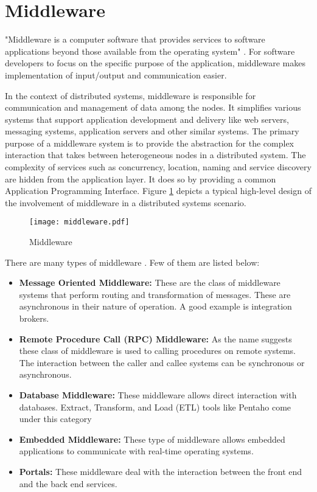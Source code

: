 \section{Middleware}

"Middleware is a computer software that provides services to software applications beyond those available from the operating system" \parencite{middleware_wiki}. For software developers to focus on the specific purpose of the application, middleware makes implementation of input/output and communication easier.

In the context of distributed systems, middleware is responsible for communication and management of data among the nodes. It simplifies various systems that support application development and delivery like web servers, messaging systems, application servers and other similar systems. The primary purpose of a middleware system is to provide the abstraction for the complex interaction that takes between heterogeneous nodes in a distributed system. The complexity of services such as concurrency, location, naming and service discovery are hidden from the application layer. It does so by providing a common Application Programming  Interface. Figure \ref{figures:middleware} depicts a typical high-level design of the involvement of middleware in a distributed systems scenario.

\makeatletter
\setlength{\@fptop}{0pt}
\makeatother

\begin{figure}[t!]
\centering
\texttt{[image: middleware.pdf]}
\caption{Middleware}\label{figures:middleware}
\end{figure}

There are many types of middleware \parencite{middleware_types}. Few of them are listed below:

\begin{itemize}
  \item \textbf{Message Oriented Middleware:} These are the class of middleware systems that perform routing and transformation of messages. These are asynchronous in their nature of operation. A good example is integration brokers. 

  \item \textbf{Remote Procedure Call (RPC) Middleware:} As the name suggests these class of middleware is used to calling procedures on remote systems. The interaction between the caller and callee systems can be synchronous or asynchronous.

  \item \textbf{Database Middleware:} These middleware allows direct interaction with databases. Extract, Transform, and Load (ETL) tools like Pentaho come under this category

  \item \textbf{Embedded Middleware:} These type of middleware allows embedded applications to communicate with real-time operating systems.

  \item \textbf{Portals:} These middleware deal with the interaction between the front end and the back end services.
\end{itemize}